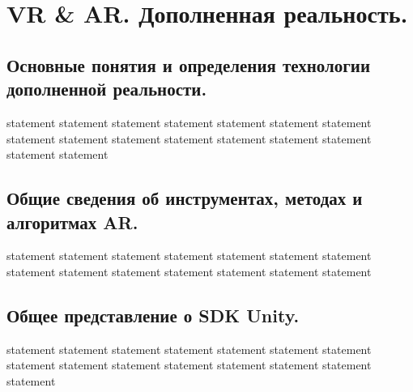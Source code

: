 \chapter{VR \& AR. Дополненная реальность.}

\section{Основные понятия и определения технологии дополненной реальности.}

{statement}
{statement}
{statement}
{statement}
{statement}
{statement}
{statement}
{statement}
{statement}
{statement}
{statement}
{statement}
{statement}
{statement}
{statement}
{statement}

\section{Общие сведения об инструментах, методах и алгоритмах AR.}

{statement}
{statement}
{statement}
{statement}
{statement}
{statement}
{statement}
{statement}
{statement}
{statement}
{statement}
{statement}
{statement}
{statement}

\section{Общее представление о SDK Unity.}

{statement}
{statement}
{statement}
{statement}
{statement}
{statement}
{statement}
{statement}
{statement}
{statement}
{statement}
{statement}
{statement}
{statement}
{statement}

